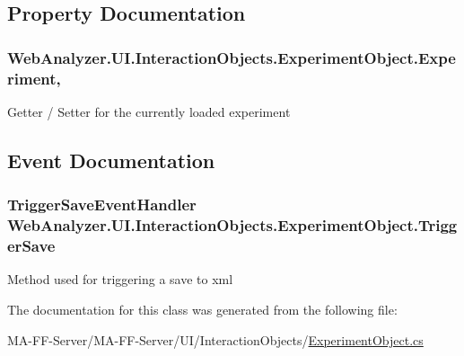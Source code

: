 \subsection{Property Documentation}
\hypertarget{class_web_analyzer_1_1_u_i_1_1_interaction_objects_1_1_experiment_object_a2b87e06b55663703f1017c95c19bfa29}{}
\subsubsection[{Experiment}]{ Web\+Analyzer.\+U\+I.\+Interaction\+Objects.\+Experiment\+Object.\+Experiment\hspace{0.3cm}{\ttfamily [get]}, {\ttfamily [set]}}\label{class_web_analyzer_1_1_u_i_1_1_interaction_objects_1_1_experiment_object_a2b87e06b55663703f1017c95c19bfa29}


Getter / Setter for the currently loaded experiment 



\subsection{Event Documentation}
\hypertarget{class_web_analyzer_1_1_u_i_1_1_interaction_objects_1_1_experiment_object_a650d83ab59dbf1753939130f39bf27fa}{}
\subsubsection[{Trigger\+Save}]{\setlength{\rightskip}{0pt plus 5cm}Trigger\+Save\+Event\+Handler Web\+Analyzer.\+U\+I.\+Interaction\+Objects.\+Experiment\+Object.\+Trigger\+Save}\label{class_web_analyzer_1_1_u_i_1_1_interaction_objects_1_1_experiment_object_a650d83ab59dbf1753939130f39bf27fa}


Method used for triggering a save to xml 



The documentation for this class was generated from the following file\+:\begin{DoxyCompactItemize}
\item 
M\+A-\/\+F\+F-\/\+Server/\+M\+A-\/\+F\+F-\/\+Server/\+U\+I/\+Interaction\+Objects/\hyperlink{_experiment_object_8cs}{Experiment\+Object.\+cs}\end{DoxyCompactItemize}
